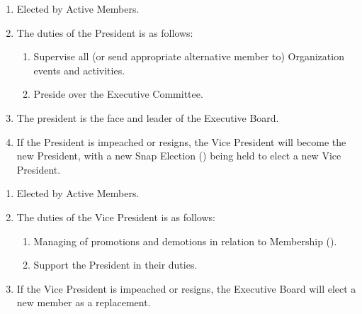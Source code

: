 
\begin{enumerate}
	\item Elected by Active Members.

	\item The duties of the President is as follows:
		\begin{enumerate}
			\item Supervise all (or send appropriate alternative member to) Organization
				events and activities.

			\item Preside over the Executive Committee.
		\end{enumerate}

	\item The president is the face and leader of the Executive Board.

	\item If the President is impeached or resigns, the Vice President will become
		the new President, with a new Snap Election ()
		being held to elect a new Vice President.
\end{enumerate}

\begin{enumerate}
	\item Elected by Active Members.

	\item The duties of the Vice President is as follows:
		\begin{enumerate}
			\item Managing of promotions and demotions in relation to Membership ().

			\item Support the President in their duties.
		\end{enumerate}

	\item If the Vice President is impeached or resigns, the Executive Board will
		elect a new member as a replacement.
\end{enumerate}

